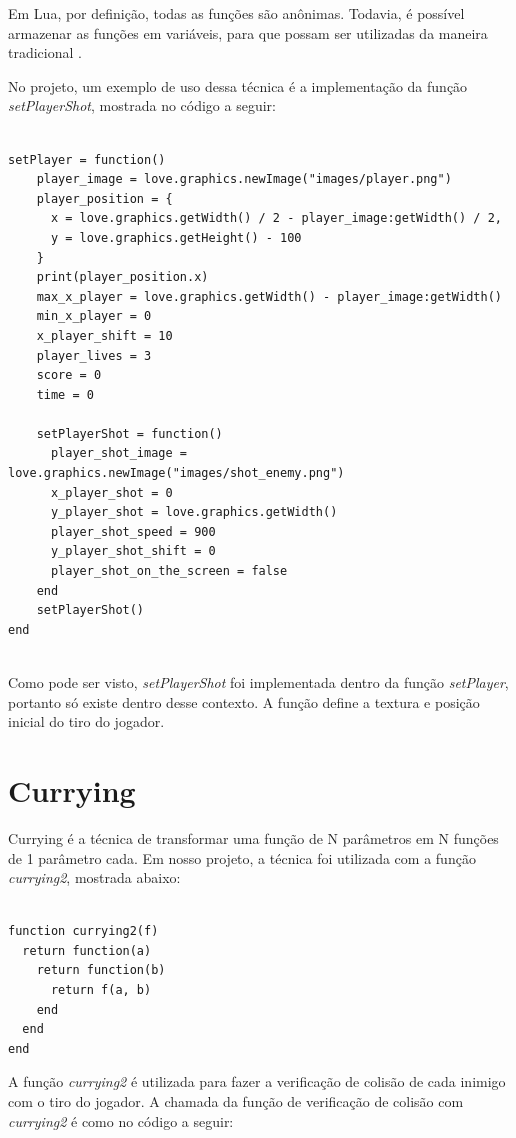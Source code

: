\documentclass[rel_mlp]{iiufrgs}
\begin{document}
Em Lua, por definição, todas as funções são anônimas. Todavia, é possível armazenar as funções em variáveis, para que possam ser utilizadas da maneira tradicional \cite{IntroLuaPDF}.

No projeto, um exemplo de uso dessa técnica é a implementação da função \textit{setPlayerShot}, mostrada no código a seguir:

\begin{lstlisting}

setPlayer = function()
    player_image = love.graphics.newImage("images/player.png")
    player_position = {
      x = love.graphics.getWidth() / 2 - player_image:getWidth() / 2,
      y = love.graphics.getHeight() - 100
    }
    print(player_position.x)
    max_x_player = love.graphics.getWidth() - player_image:getWidth()
    min_x_player = 0
    x_player_shift = 10
    player_lives = 3
    score = 0
    time = 0

    setPlayerShot = function()
      player_shot_image = love.graphics.newImage("images/shot_enemy.png")
      x_player_shot = 0
      y_player_shot = love.graphics.getWidth()
      player_shot_speed = 900
      y_player_shot_shift = 0
      player_shot_on_the_screen = false
    end
    setPlayerShot()
end
    
\end{lstlisting}

Como pode ser visto, \textit{setPlayerShot} foi implementada dentro da função \textit{setPlayer}, portanto só existe dentro desse contexto. A função define a textura e posição inicial do tiro do jogador.

\section{Currying} \label{Currying}

Currying é a técnica de transformar uma função de N parâmetros em N funções de 1 parâmetro cada. Em nosso projeto, a técnica foi utilizada com a função \textit{currying2}, mostrada abaixo:

\begin{lstlisting}

function currying2(f)
  return function(a)
    return function(b)
      return f(a, b)
    end
  end
end

\end{lstlisting}

A função \textit{currying2} é utilizada para fazer a verificação de colisão de cada inimigo com o tiro do jogador. A chamada da função de verificação de colisão com \textit{currying2} é como no código a seguir:
\end{document}
